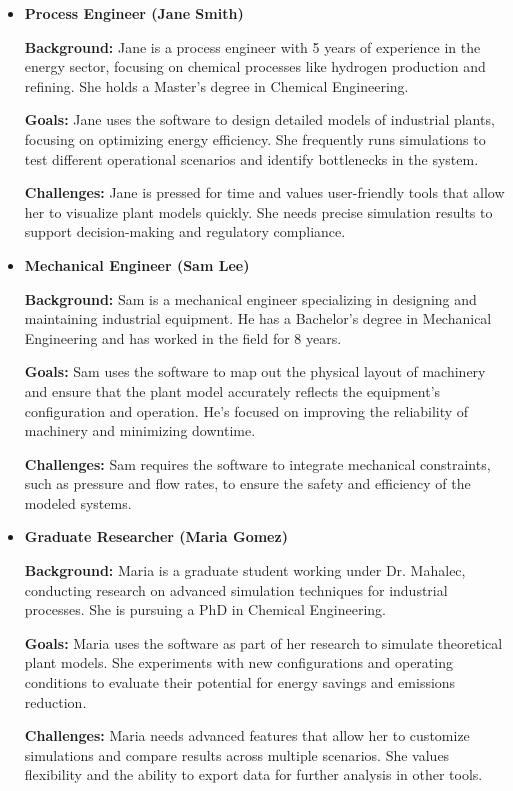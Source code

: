 \documentclass[12pt]{article}
\begin{document}
\begin{itemize}
    \item \textbf{Process Engineer (Jane Smith)}
    
    \textbf{Background:} Jane is a process engineer with 5 years of experience in the energy sector, focusing on chemical processes like hydrogen production and refining. She holds a Master's degree in Chemical Engineering.
    
    \textbf{Goals:} Jane uses the software to design detailed models of industrial plants, focusing on optimizing energy efficiency. She frequently runs simulations to test different operational scenarios and identify bottlenecks in the system.
    
    \textbf{Challenges:} Jane is pressed for time and values user-friendly tools that allow her to visualize plant models quickly. She needs precise simulation results to support decision-making and regulatory compliance.
    
    \item \textbf{Mechanical Engineer (Sam Lee)}
    
    \textbf{Background:} Sam is a mechanical engineer specializing in designing and maintaining industrial equipment. He has a Bachelor’s degree in Mechanical Engineering and has worked in the field for 8 years.
    
    \textbf{Goals:} Sam uses the software to map out the physical layout of machinery and ensure that the plant model accurately reflects the equipment’s configuration and operation. He’s focused on improving the reliability of machinery and minimizing downtime.
    
    \textbf{Challenges:} Sam requires the software to integrate mechanical constraints, such as pressure and flow rates, to ensure the safety and efficiency of the modeled systems.
    
    \item \textbf{Graduate Researcher (Maria Gomez)}
    
    \textbf{Background:} Maria is a graduate student working under Dr. Mahalec, conducting research on advanced simulation techniques for industrial processes. She is pursuing a PhD in Chemical Engineering.
    
    \textbf{Goals:} Maria uses the software as part of her research to simulate theoretical plant models. She experiments with new configurations and operating conditions to evaluate their potential for energy savings and emissions reduction.
    
    \textbf{Challenges:} Maria needs advanced features that allow her to customize simulations and compare results across multiple scenarios. She values flexibility and the ability to export data for further analysis in other tools.
\end{itemize}
\end{document}
